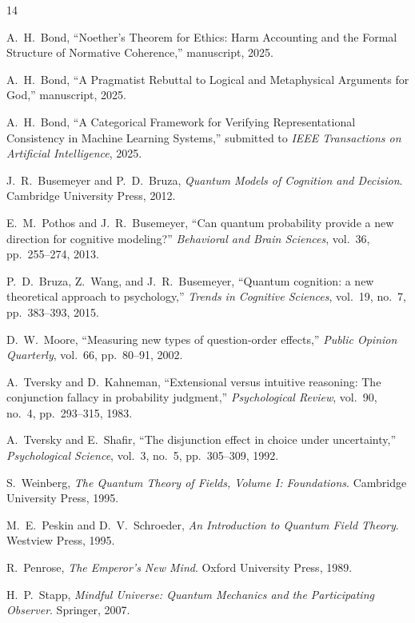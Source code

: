 \documentclass[12pt]{article}
\begin{document}
\begin{thebibliography}{14}

A.~H.~Bond, ``Noether's Theorem for Ethics: Harm Accounting and the Formal Structure of Normative Coherence,'' manuscript, 2025.

A.~H.~Bond, ``A Pragmatist Rebuttal to Logical and Metaphysical Arguments for God,'' manuscript, 2025.

A.~H.~Bond, ``A Categorical Framework for Verifying Representational Consistency in Machine Learning Systems,'' submitted to \emph{IEEE Transactions on Artificial Intelligence}, 2025.

J.~R.~Busemeyer and P.~D.~Bruza, \emph{Quantum Models of Cognition and Decision}. Cambridge University Press, 2012.

E.~M.~Pothos and J.~R.~Busemeyer, ``Can quantum probability provide a new direction for cognitive modeling?'' \emph{Behavioral and Brain Sciences}, vol.~36, pp.~255--274, 2013.

P.~D.~Bruza, Z.~Wang, and J.~R.~Busemeyer, ``Quantum cognition: a new theoretical approach to psychology,'' \emph{Trends in Cognitive Sciences}, vol.~19, no.~7, pp.~383--393, 2015.

D.~W.~Moore, ``Measuring new types of question-order effects,'' \emph{Public Opinion Quarterly}, vol.~66, pp.~80--91, 2002.

A.~Tversky and D.~Kahneman, ``Extensional versus intuitive reasoning: The conjunction fallacy in probability judgment,'' \emph{Psychological Review}, vol.~90, no.~4, pp.~293--315, 1983.

A.~Tversky and E.~Shafir, ``The disjunction effect in choice under uncertainty,'' \emph{Psychological Science}, vol.~3, no.~5, pp.~305--309, 1992.

S.~Weinberg, \emph{The Quantum Theory of Fields, Volume I: Foundations}. Cambridge University Press, 1995.

M.~E.~Peskin and D.~V.~Schroeder, \emph{An Introduction to Quantum Field Theory}. Westview Press, 1995.

R.~Penrose, \emph{The Emperor's New Mind}. Oxford University Press, 1989.

H.~P.~Stapp, \emph{Mindful Universe: Quantum Mechanics and the Participating Observer}. Springer, 2007.


\end{thebibliography}
\end{document}
